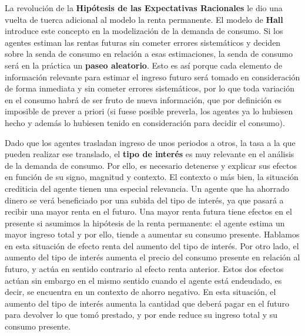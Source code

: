 \documentclass{nuevotema}
\begin{document}
La revolución de la \textbf{Hipótesis de las Expectativas Racionales} le dio una vuelta de tuerca adicional al modelo la renta permanente. El modelo de \textbf{Hall} introduce este concepto en la modelización de la demanda de consumo. Si los agentes estiman las rentas futuras sin cometer errores sistemáticos y deciden sobre la senda de consumo en relación a esas estimaciones, la senda de consumo será en la práctica un \textbf{paseo aleatorio}. Esto es así porque cada elemento de información relevante para estimar el ingreso futuro será tomado en consideración de forma inmediata y sin cometer errores sistemáticos, por lo que toda variación en el consumo habrá de ser fruto de nueva información, que por definición es imposible de prever a priori (si fuese posible preverla, los agentes ya lo hubiesen hecho y además lo hubiesen tenido en consideración para decidir el consumo).

Dado que los agentes trasladan ingreso de unos periodos a otros, la tasa a la que pueden realizar ese translado, el \textbf{tipo de interés} es muy relevante en el análisis de la demanda de consumo. Por ello, es necesario detenerse y explicar sus efectos en función de su signo, magnitud y contexto. El contexto o más bien, la situación crediticia del agente tienen una especial relevancia. Un agente que ha ahorrado dinero se verá beneficiado por una subida del tipo de interés, ya que pasará a recibir una mayor renta en el futuro. Una mayor renta futura tiene efectos en el presente si asumimos la hipótesis de la renta permanente: el agente estima un mayor ingreso total y por ello, tiende a aumentar su consumo presente. Hablamos en esta situación de efecto renta del aumento del tipo de interés. Por otro lado, el aumento del tipo de interés aumenta el precio del consumo presente en relación al futuro, y actúa en sentido contrario al efecto renta anterior. Estos dos efectos actúan sin embargo en el mismo sentido cuando el agente está endeudado, es decir, se encuentra en un contexto de ahorro negativo. En esta situación, el aumento del tipo de interés aumenta la cantidad que deberá pagar en el futuro para devolver lo que tomó prestado, y por ende reduce su ingreso total y su consumo presente. 
\end{document}
